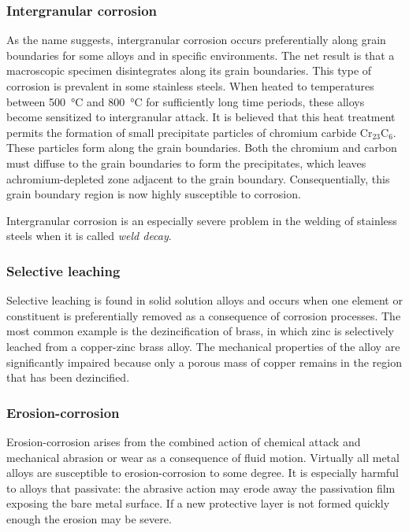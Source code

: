 \subsubsection{Intergranular corrosion}
As the name suggests, intergranular corrosion occurs preferentially along grain boundaries for some alloys and in specific environments. The net result is that a macroscopic specimen disintegrates along its grain boundaries. This type of corrosion is prevalent in some stainless steels. When heated to temperatures between \qty{500}{\celsius} and \qty{800}{\celsius} for sufficiently long time periods, these alloys become sensitized to intergranular attack. It is believed that this heat treatment permits the formation of small precipitate particles of chromium carbide $\mathrm{Cr}_{23}\mathrm{C}_6$. These particles form along the grain boundaries. Both the chromium and carbon must diffuse to the grain boundaries to form the precipitates, which leaves achromium-depleted zone adjacent to the grain boundary. Consequentially, this grain boundary region is now highly susceptible to corrosion.

Intergranular corrosion is an especially severe problem in the welding of stainless steels when it is called \textit{weld decay}. 

\subsubsection{Selective leaching}
Selective leaching is found in solid solution alloys and occurs when one element or constituent is preferentially removed as a consequence of corrosion processes. The most common example is the dezincification of brass, in which zinc is selectively leached from a copper-zinc brass alloy. The mechanical properties of the alloy are significantly impaired because only a porous mass of copper remains in the region that has been dezincified.

\subsubsection{Erosion-corrosion}
Erosion-corrosion arises from the combined action of chemical attack and mechanical abrasion or wear as a consequence of fluid motion. Virtually all metal alloys are susceptible to erosion-corrosion to some degree. It is especially harmful to alloys that passivate: the abrasive action may erode away the passivation film exposing the bare metal surface. If a new protective layer is not formed quickly enough the erosion may be severe. 

